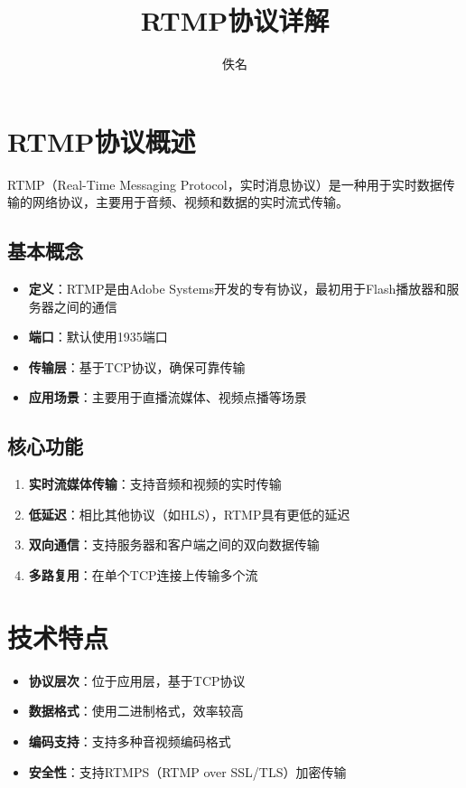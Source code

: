 \documentclass[12pt,UTF8]{ctexbook}
\title{\heiti\zihao{0} RTMP协议详解}
\author{佚名}
\date{}
\begin{document}
\maketitle
\tableofcontents

\frontmatter

\mainmatter

\chapter{RTMP协议概述}

RTMP（Real-Time Messaging Protocol，实时消息协议）是一种用于实时数据传输的网络协议，主要用于音频、视频和数据的实时流式传输。

\section{基本概念}

\begin{itemize}
  \item \textbf{定义}：RTMP是由Adobe Systems开发的专有协议，最初用于Flash播放器和服务器之间的通信
  \item \textbf{端口}：默认使用1935端口
  \item \textbf{传输层}：基于TCP协议，确保可靠传输
  \item \textbf{应用场景}：主要用于直播流媒体、视频点播等场景
\end{itemize}

\section{核心功能}

\begin{enumerate}
  \item \textbf{实时流媒体传输}：支持音频和视频的实时传输
  \item \textbf{低延迟}：相比其他协议（如HLS），RTMP具有更低的延迟
  \item \textbf{双向通信}：支持服务器和客户端之间的双向数据传输
  \item \textbf{多路复用}：在单个TCP连接上传输多个流
\end{enumerate}

\chapter{技术特点}

\begin{itemize}
  \item \textbf{协议层次}：位于应用层，基于TCP协议
  \item \textbf{数据格式}：使用二进制格式，效率较高
  \item \textbf{编码支持}：支持多种音视频编码格式
  \item \textbf{安全性}：支持RTMPS（RTMP over SSL/TLS）加密传输
\end{itemize}
\end{document}

